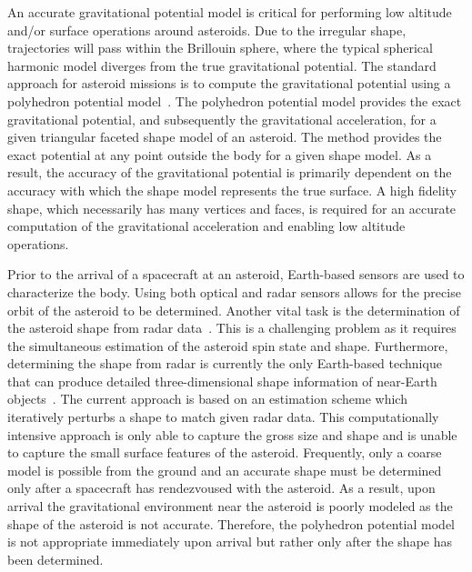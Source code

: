 \documentclass[journal]{new-aiaa}
\begin{document}
An accurate gravitational potential model is critical for performing low altitude and/or surface operations around asteroids.
Due to the irregular shape, trajectories will pass within the Brillouin sphere, where the typical spherical harmonic model diverges from the true gravitational potential.
The standard approach for asteroid missions is to compute the gravitational potential using a polyhedron potential model~\cite{werner1996}.
The polyhedron potential model provides the exact gravitational potential, and subsequently the gravitational acceleration, for a given triangular faceted shape model of an asteroid.
The method provides the exact potential at any point outside the body for a given shape model.
As a result, the accuracy of the gravitational potential is primarily dependent on the accuracy with which the shape model represents the true surface.
A high fidelity shape, which necessarily has many vertices and faces, is required for an accurate computation of the gravitational acceleration and enabling low altitude operations.

Prior to the arrival of a spacecraft at an asteroid, Earth-based sensors are used to characterize the body.
Using both optical and radar sensors allows for the precise orbit of the asteroid to be determined.
Another vital task is the determination of the asteroid shape from radar data~\cite{hudson1994,busch2011}.
This is a challenging problem as it requires the simultaneous estimation of the asteroid spin state and shape.
Furthermore, determining the shape from radar is currently the only Earth-based technique that can produce detailed three-dimensional shape information of near-Earth objects~\cite{greenberg2015}.
The current approach is based on an estimation scheme which iteratively perturbs a shape to match given radar data.
This computationally intensive approach is only able to capture the gross size and shape and is unable to capture the small surface features of the asteroid.
Frequently, only a coarse model is possible from the ground and an accurate shape must be determined only after a spacecraft has rendezvoused with the asteroid.
As a result, upon arrival the gravitational environment near the asteroid is poorly modeled as the shape of the asteroid is not accurate.
Therefore, the polyhedron potential model is not appropriate immediately upon arrival but rather only after the shape has been determined.
\end{document}
